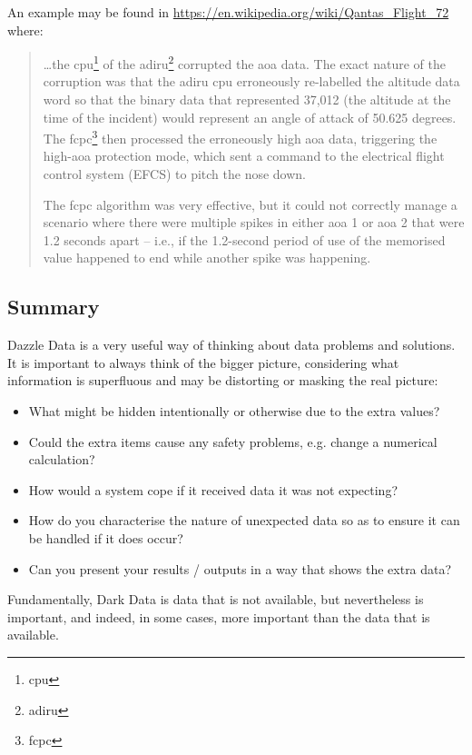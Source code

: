 An example may be found in
\href{https://en.wikipedia.org/wiki/Qantas\_Flight\_72}{https://en.wikipedia.org/wiki/Qantas\_Flight\_72}
where:
\begin{quotation}
  \dots the \acrshort{cpu}\footnote{\acrlong{cpu}} of the \acrshort{adiru}\footnote{\acrlong{adiru}} corrupted the \acrfull{aoa} data. The exact nature of the corruption was that the \acrshort{adiru} \acrshort{cpu} erroneously re-labelled the altitude data word so that the binary data that represented 37,012 (the altitude at the time of the incident) would represent an angle of attack of 50.625 degrees. The \acrshort{fcpc}\footnote{\acrlong{fcpc}} then processed the erroneously high \gls{aoa} data, triggering the high-\gls{aoa} protection mode, which sent a command to the electrical flight control system (EFCS) to pitch the nose down.
  
  The \acrshort{fcpc} algorithm was very effective, but it could not correctly manage a scenario where there were multiple spikes in either \gls{aoa} 1 or \gls{aoa} 2 that were 1.2 seconds apart -- i.e., if the 1.2-second period of use of the memorised value happened to end while another spike was happening.
  \end{quotation}

\subsection{Summary}
Dazzle Data is a very useful way of thinking about data problems and solutions.
It is important to always think of the bigger picture,
considering what information is superfluous and may be distorting or masking the real picture:
\begin{itemize}
    \item What might be hidden intentionally or otherwise due to the extra values?
    \item Could the extra items cause any safety problems, e.g. change a numerical calculation?
    \item How would a system cope if it received data it was not expecting?
    \item How do you characterise the nature of unexpected data so as to ensure it can be handled if it does occur?
    \item Can you present your results / outputs in a way that shows the extra data?
\end{itemize}

Fundamentally, Dark Data is data that is not available, but nevertheless is important, and indeed, in some cases, more important than the data that is available.

